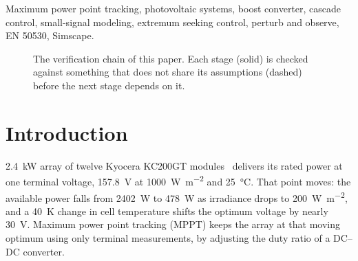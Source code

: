 \documentclass[journal]{IEEEtran}
\newcommand{\Wm}{\si{\watt\per\square\metre}}
\begin{document}
\begin{IEEEkeywords}
Maximum power point tracking, photovoltaic systems, boost converter, cascade control, small-signal
modeling, extremum seeking control, perturb and observe, EN 50530, Simscape.
\end{IEEEkeywords}

\begin{figure}[t]
\centering
{}
\caption{The verification chain of this paper. Each stage (solid) is checked against something that does
not share its assumptions (dashed) before the next stage depends on it.}
\label{fig:chain}
\end{figure}

\section{Introduction}
 \SI{2.4}{\kilo\watt} array of twelve Kyocera KC200GT modules~\cite{kyocera} delivers
its rated power at one terminal voltage, \SI{157.8}{\volt} at \SI{1000}{\Wm} and \SI{25}{\celsius}. That
point moves: the available power falls from \SI{2402}{\watt} to \SI{478}{\watt} as irradiance drops to
\SI{200}{\Wm}, and a \SI{40}{\kelvin} change in cell temperature shifts the optimum voltage by nearly
\SI{30}{\volt}. Maximum power point tracking (MPPT) keeps the array at that moving optimum using only
terminal measurements, by adjusting the duty ratio of a DC--DC converter.
\end{document}
